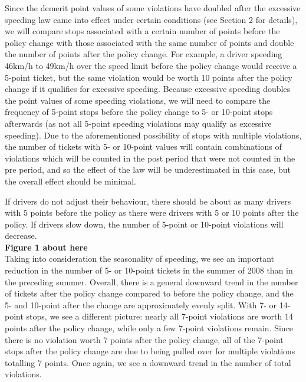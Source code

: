 Since the demerit point values of some violations have doubled after the excessive speeding law came into effect under certain conditions (see Section 2 for details), we will compare stops associated with a certain number of points before the policy change with those associated with the same number of points and double the number of points after the policy change. For example, a driver speeding 46km/h to 49km/h over the speed limit before the policy change would receive a 5-point ticket, but the same violation would be worth 10 points after the policy change if it qualifies for excessive speeding. Because excessive speeding doubles the point values of some speeding violations, we will need to compare the frequency of 5-point stops before the policy change to 5- or 10-point stops afterwards (as not all 5-point speeding violations may qualify as excessive speeding). Due to the aforementioned possibility of stops with multiple violations, the number of tickets with 5- or 10-point values will contain combinations of violations which will be counted in the post period that were not counted in the pre period, and so the effect of the law will be underestimated in this case, but the overall effect should be minimal.

If drivers do not adjust their behaviour, there should be about as many drivers with 5 points before the policy as there were drivers with 5 or 10 points after the policy. If drivers slow down, the number of 5-point or 10-point violations will decrease. \\

\textbf{Figure 1 about here} \\

Taking into consideration the seasonality of speeding, we see an important reduction in the number of 5- or 10-point tickets in the summer of 2008 than in the preceding summer. Overall, there is a general downward trend in the number of tickets after the policy change compared to before the policy change, and the 5- and 10-point after the change are approximately evenly split. 
With 7- or 14-point stops, we see a different picture: nearly all 7-point violations are worth 14 points after the policy change, while only a few 7-point violations remain. Since there is no violation worth 7 points after the policy change, all of the 7-point stops after the policy change are due to being pulled over for multiple violations totalling 7 points. Once again, we see a downward trend in the number of total violations. \\

